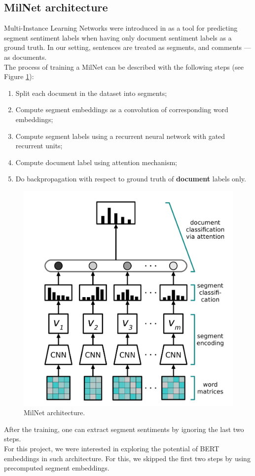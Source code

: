 \subsection{MilNet architecture}
Multi-Instance Learning Networks were introduced in \cite{angelidis2017multiple} as a tool for predicting segment sentiment labels when having only document sentiment labels as a ground truth. In our setting, sentences are treated as segments, and comments --- as documents. \\
The process of training a MilNet can be described with the following steps (see Figure \ref{milnet}):
\begin{enumerate}[label=(\alph*)]
    \item Split each document in the dataset into segments;
    \item Compute segment embeddings as a convolution of corresponding word embeddings;
    \item Compute segment labels using a recurrent neural network with gated recurrent units;
    \item Compute document label using attention mechanism;
    \item Do backpropagation with respect to ground truth of {\bf document} labels only.
\end{enumerate}

\begin{figure}[h]
\centerline{\includegraphics[scale=.2]{images/milnet.png}}
\caption{MilNet architecture.}
\label{milnet}
\end{figure}
After the training, one can extract segment sentiments by ignoring the last two steps. \\
For this project, we were interested in exploring the potential of BERT embeddings in such architecture. For this, we skipped the first two steps by using precomputed segment embeddings. 

